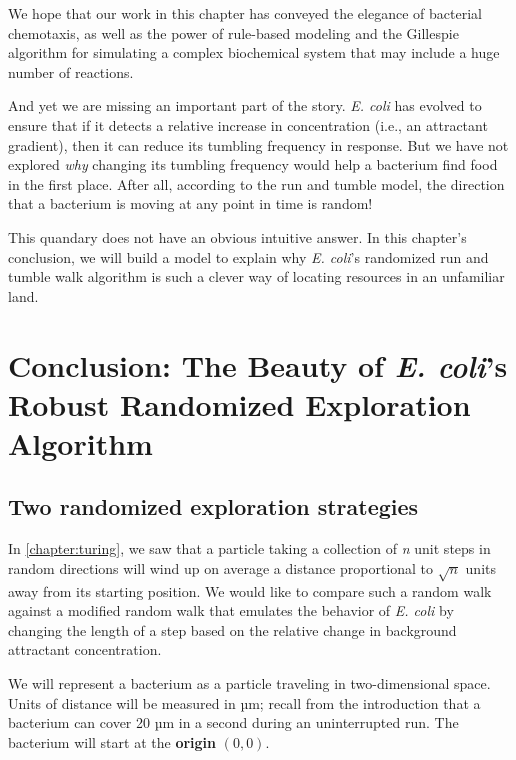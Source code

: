 We hope that our work in this chapter has conveyed the elegance of bacterial chemotaxis, as well as the power of rule-based modeling and the Gillespie algorithm for simulating a complex biochemical system that may include a huge number of reactions.

And yet we are missing an important part of the story. \textit{E. coli} has evolved to ensure that if it detects a relative increase in concentration (i.e., an attractant gradient), then it can reduce its tumbling frequency in response. But we have not explored \textit{why} changing its tumbling frequency would help a bacterium find food in the first place. After all, according to the run and tumble model, the direction that a bacterium is moving at any point in time is random!

This quandary does not have an obvious intuitive answer. In this chapter's conclusion, we will build a model to explain why \textit{E. coli}'s randomized run and tumble walk algorithm is such a clever way of locating resources in an unfamiliar land.\\


\FloatBarrier
{}

\section{Conclusion: The Beauty of \textit{E. coli}'s Robust Randomized Exploration Algorithm}
\label{sec:conclusion}

\subsection{Two randomized exploration strategies}

In \autoref{chapter:turing}, we saw that a particle taking a collection of \textit{n} unit steps in random directions will wind up on average a distance proportional to $\sqrt{n}$ units away from its starting position. We would like to compare such a random walk against a modified random walk that emulates the behavior of \textit{E. coli} by changing the length of a step based on the relative change in background attractant concentration.

We will represent a bacterium as a particle traveling in two-dimensional space. Units of distance will be measured in µm; recall from the introduction that a bacterium can cover 20 µm in a second during an uninterrupted run. The bacterium will start at the \textbf{origin} $(0, 0)$.

